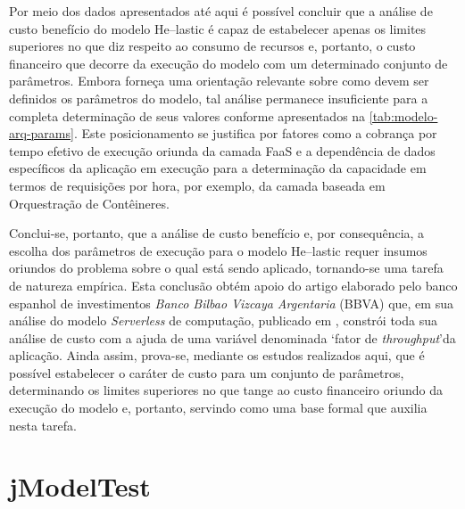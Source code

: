\documentclass[english,brazilian]{UNISINOSmonografia} %
\begin{document}
Por meio dos dados apresentados até aqui é possível concluir que a análise de custo benefício do modelo \textsf{He}--lastic é capaz de estabelecer apenas os limites superiores no que diz respeito ao consumo de recursos e, portanto, o custo financeiro que decorre da execução do modelo com um determinado conjunto de parâmetros.
Embora forneça uma orientação relevante sobre como devem ser definidos os parâmetros do modelo, tal análise permanece insuficiente para a completa determinação de seus valores conforme apresentados na \autoref{tab:modelo-arq-params}.
Este posicionamento se justifica por fatores como a cobrança por tempo efetivo de execução oriunda da camada FaaS e a dependência de dados específicos da aplicação em execução para a determinação da capacidade em termos de requisições por hora, por exemplo, da camada baseada em Orquestração de Contêineres.


Conclui-se, portanto, que a análise de custo benefício e, por consequência, a escolha dos parâmetros de execução para o modelo \textsf{He}--lastic requer insumos oriundos do problema sobre o qual está sendo aplicado, tornando-se uma tarefa de natureza empírica.
Esta conclusão obtém apoio do artigo elaborado pelo banco espanhol de investimentos \textit{Banco Bilbao Vizcaya Argentaria} (BBVA) que, em sua análise do modelo \textit{Serverless} de computação, publicado em , constrói toda sua análise de custo com a ajuda de uma variável denominada \textquoteleft fator de \textit{throughput}\textquoteright  da aplicação. 
Ainda assim, prova-se, mediante os estudos realizados aqui, que é possível estabelecer o caráter de custo para um conjunto de parâmetros, determinando os limites superiores no que tange ao custo financeiro oriundo da execução do modelo e, portanto, servindo como uma base formal que auxilia nesta tarefa.

%










\section{jModelTest}
\label{sec:resultados-jmodel}
\end{document}
